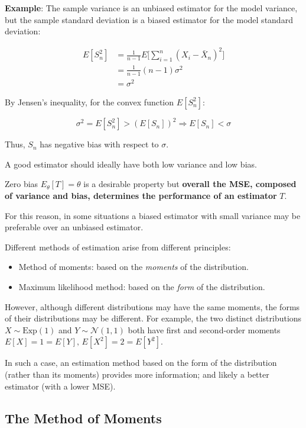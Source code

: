 \begin{paracol}{2}
\textbf{Example}: The sample variance is an unbiased estimator for the model variance, but the sample standard deviation is a biased estimator for the model standard deviation:

\begin{align*}
    E[S_n^2] & = \frac{1}{n-1} E \big[ \sum_{i=1}^n (X_i - \bar{X}_n)^2 \big] \\
    & = \frac{1}{n-1} (n-1) \sigma^2 \\
    & = \sigma^2
\end{align*}

By Jensen's inequality, for the convex function $E[S_n^2]$:

$$\sigma^2 = E[S_n^2] > (E[S_n])^2 \Rightarrow E[S_n] < \sigma$$

Thus, $S_n$ has negative bias with respect to $\sigma$.

\end{paracol}

A good estimator should ideally have both low variance and low bias.

Zero bias $E_\theta[T] = \theta$ is a desirable property but \textbf{overall the MSE, composed of variance and bias, determines the performance of an estimator} $T$.

For this reason, in some situations a biased estimator with small variance may be preferable over an unbiased estimator.

Different methods of estimation arise from different principles:

\begin{itemize}
    \item Method of moments: based on the \textit{moments} of the distribution.
    \item Maximum likelihood method: based on the \textit{form} of the distribution.
\end{itemize}

However, although different distributions may have the same moments, the forms of their distributions may be different. For example, the two distinct distributions $X \sim \text{Exp}(1)$ and $Y \sim \mathcal{N}(1, 1)$ both have first and second-order moments $E[X] = 1 = E[Y], \, E[X^2] = 2 = E[Y^2]$.

In such a case, an estimation method based on the form of the distribution (rather than its moments) provides more information; and likely a better estimator (with a lower MSE).

\subsection{The Method of Moments}


